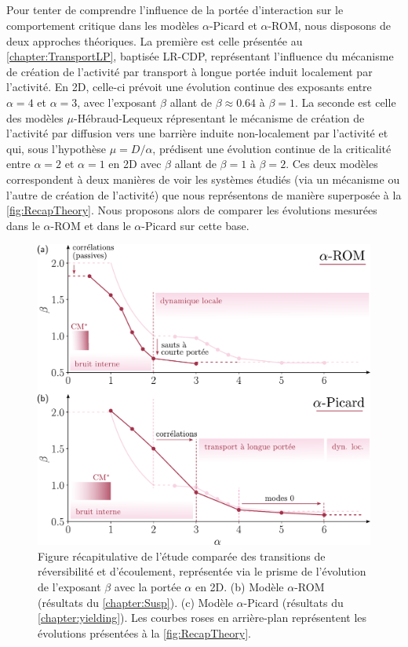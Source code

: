 \subparagraph{}Pour tenter de comprendre l'influence de la portée d'interaction sur le comportement critique dans les modèles $\alpha$-Picard et $\alpha$-ROM, nous disposons de deux approches théoriques. La première est celle présentée au \autoref{chapter:TransportLP}, baptisée LR-CDP, représentant l'influence du mécanisme de création de l'activité par transport à longue portée induit localement par l'activité. En 2D, celle-ci prévoit une évolution continue des exposants entre $\alpha = 4$ et $\alpha = 3$, avec l'exposant $\beta$ allant de $\beta \approx 0.64$ à $\beta = 1$. La seconde est celle des modèles $\mu$-Hébraud-Lequeux répresentant le mécanisme de création de l'activité par diffusion vers une barrière induite non-localement par l'activité et qui, sous l'hypothèse $\mu = D/\alpha$, prédisent une évolution continue de la criticalité entre $\alpha=2$ et $\alpha = 1$ en 2D avec $\beta$ allant de $\beta = 1$ à $\beta = 2$. Ces deux modèles correspondent à deux manières de voir les systèmes étudiés (via un mécanisme ou l'autre de création de l'activité) que nous représentons de manière superposée à la \autoref{fig:RecapTheory}. Nous proposons alors de comparer les évolutions mesurées dans le $\alpha$-ROM et dans le $\alpha$-Picard sur cette base.

\begin{figure}[H]
	\centering
	\includegraphics[width=\textwidth]{Chapitre5/Figures/FigRecap.pdf}
	\caption{Figure récapitulative de l'étude comparée des transitions de réversibilité et d'écoulement, représentée via le prisme de l'évolution de l'exposant $\beta$ avec la portée $\alpha$ en 2D. (b) Modèle $\alpha$-ROM (résultats du \autoref{chapter:Susp}). (c) Modèle $\alpha$-Picard (résultats du \autoref{chapter:yielding}). Les courbes roses en arrière-plan représentent les évolutions présentées à la \autoref{fig:RecapTheory}.}
	\label{fig:Recap}
\end{figure}

